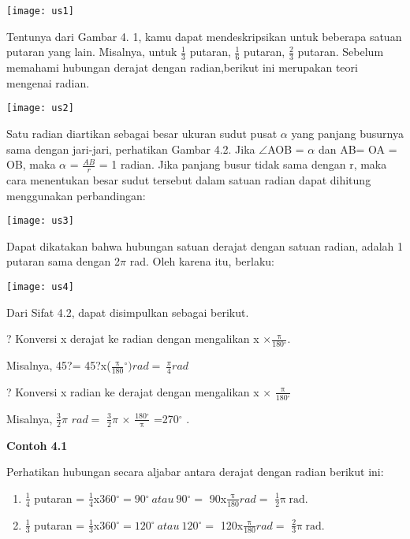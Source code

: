 \documentclass[11pt,fleqn]{book} %
\begin{document}
\begin{myEnumerate}
\begin{itemize}
\texttt{[image: us1]}

Tentunya dari Gambar 4. 1, kamu dapat mendeskripsikan untuk beberapa satuan putaran yang lain. Misalnya, untuk $\frac{1}{3}$ putaran, $\frac{1}{6}$ putaran, $\frac{2}{3}$ putaran. Sebelum memahami hubungan derajat dengan radian,berikut ini merupakan teori mengenai radian.

\texttt{[image: us2]}

Satu radian diartikan sebagai besar ukuran sudut pusat $\alpha$ yang panjang busurnya sama dengan jari-jari, perhatikan Gambar 4.2. Jika $\mathrm{\angle}$AOB = $\alpha$ dan AB= OA = OB, maka $\alpha$ = $\frac{AB}{r}$  = 1 radian. Jika panjang busur tidak sama dengan r, maka cara menentukan besar sudut tersebut dalam satuan  radian dapat dihitung menggunakan perbandingan:

\texttt{[image: us3]}

Dapat dikatakan bahwa hubungan satuan derajat dengan satuan radian, adalah 1 putaran sama dengan 2$\pi$ rad. Oleh karena itu, berlaku:

\texttt{[image: us4]}

Dari Sifat 4.2, dapat disimpulkan sebagai berikut. 

? Konversi x derajat ke radian dengan mengalikan x $\times$$\frac{\mathrm{\pi }}{180{}^\circ }$.

Misalnya, 45?= 45?x($\frac{\mathrm{\pi }}{\mathrm{180}}\mathrm{{}^\circ )}rad=\ \frac{\pi }{4}rad$

? Konversi x radian ke derajat dengan mengalikan x $\times$ $\frac{\mathrm{\pi }}{180{}^\circ }$

Misalnya, $\frac{3}{2}$$\pi$ $rad=$ $\frac{3}{2}$$\pi$ $\times$ $\frac{180{}^\circ }{\mathrm{\pi }}$ =270${}^\circ $ .

\textbf{Contoh 4.1}

Perhatikan hubungan secara aljabar antara derajat dengan radian berikut ini:

\begin{enumerate}
\item  $\frac{1}{4}$ putaran = $\frac{1}{4}$x360${}^\circ =90{}^\circ \ atau\ 90{}^\circ =$ 90x$\frac{\mathrm{\pi }}{180}rad=$ $\frac{\mathrm{1}}{2}\mathrm{\pi }\mathrm{\ rad.}$ 

\item  $\frac{1}{3}$ putaran = $\frac{1}{3}$x360${}^\circ =120{}^\circ \ atau\ 120{}^\circ =$ 120x$\frac{\mathrm{\pi }}{180}rad=$ $\frac{\mathrm{2}}{3}\mathrm{\pi }\mathrm{\ rad.}$


\end{enumerate}
\end{itemize}
\end{myEnumerate}
\end{document}
